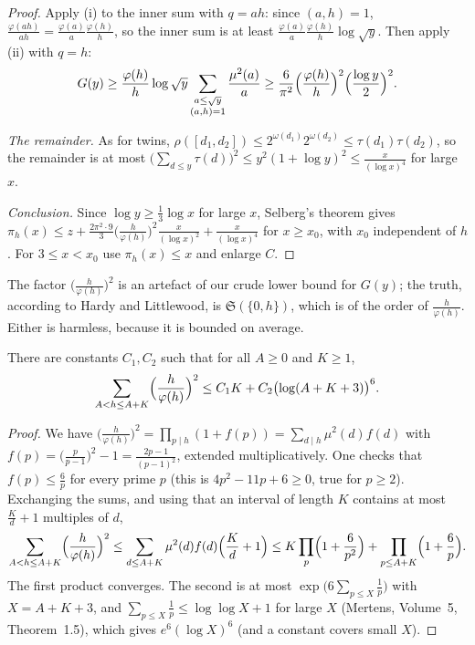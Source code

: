 \begin{proof}
Apply (i) to the inner sum with $q=ah$: since $(a,h)=1$, $\frac{\varphi(ah)}{ah}=\frac{\varphi(a)}a\frac{\varphi(h)}h$, so the inner sum is at least
$\frac{\varphi(a)}a\frac{\varphi(h)}h\log\sqrt y$. Then apply (ii) with $q=h$:
\[
G(y)\ge\frac{\varphi(h)}h\log\sqrt y\sum_{\substack{a\le\sqrt y\\(a,h)=1}}\frac{\mu^2(a)}a\ge\frac6{\pi^2}\Bigl(\frac{\varphi(h)}h\Bigr)^2\Bigl(\frac{\log y}2\Bigr)^2.
\]

\emph{The remainder.} As for twins, $\rho([d_1,d_2])\le2^{\omega(d_1)}2^{\omega(d_2)}\le\tau(d_1)\tau(d_2)$, so the remainder is at most
$\bigl(\sum_{d\le y}\tau(d)\bigr)^2\le y^2(1+\log y)^2\le\frac x{(\log x)^4}$ for large $x$.

\emph{Conclusion.} Since $\log y\ge\frac13\log x$ for large $x$, Selberg's theorem gives
$\pi_h(x)\le z+\frac{2\pi^2\cdot9}3\bigl(\frac h{\varphi(h)}\bigr)^2\frac x{(\log x)^2}+\frac x{(\log x)^4}$ for $x\ge x_0$, with $x_0$ independent of $h$. For
$3\le x<x_0$ use $\pi_h(x)\le x$ and enlarge $C$.
\end{proof}

The factor $\bigl(\frac h{\varphi(h)}\bigr)^2$ is an artefact of our crude lower bound for $G(y)$; the truth, according to Hardy and Littlewood, is
$\mathfrak S(\{0,h\})$, which is of the order of $\frac h{\varphi(h)}$. Either is harmless, because it is bounded on average.

\begin{lemma}\label{conjectures:lem:hphi}
There are constants $C_1,C_2$ such that for all $A\ge0$ and $K\ge1$,
\[
\sum_{A<h\le A+K}\Bigl(\frac h{\varphi(h)}\Bigr)^2\le C_1K+C_2\bigl(\log(A+K+3)\bigr)^6.
\]
\end{lemma}
\begin{proof}
We have $\bigl(\frac h{\varphi(h)}\bigr)^2=\prod_{p\mid h}(1+f(p))=\sum_{d\mid h}\mu^2(d)f(d)$ with $f(p)=\bigl(\frac p{p-1}\bigr)^2-1=\frac{2p-1}{(p-1)^2}$, extended
multiplicatively. One checks that $f(p)\le\frac6p$ for every prime $p$ (this is $4p^2-11p+6\ge0$, true for $p\ge2$). Exchanging the sums, and using
that an interval of length $K$ contains at most $\frac Kd+1$ multiples of $d$,
\[
\sum_{A<h\le A+K}\Bigl(\frac h{\varphi(h)}\Bigr)^2\le\sum_{d\le A+K}\mu^2(d)f(d)\Bigl(\frac Kd+1\Bigr)\le K\prod_p\Bigl(1+\frac6{p^2}\Bigr)+\prod_{p\le A+K}\Bigl(1+\frac6p\Bigr).
\]
The first product converges. The second is at most $\exp\bigl(6\sum_{p\le X}\frac1p\bigr)$ with $X=A+K+3$, and $\sum_{p\le X}\frac1p\le\log\log X+1$ for large $X$
(Mertens, Volume~5, Theorem~1.5), which gives $e^6(\log X)^6$ (and a constant covers small $X$).
\end{proof}

